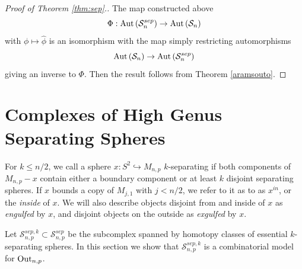 
\begin{proof}[Proof of Theorem \ref{thm:sep}.]
The map constructed above
$$\Phi: \operatorname{Aut} \left ( \mathcal S^{sep}_n \right) \to \operatorname{Aut} \left ( \mathcal S_n \right)$$
with $\phi \mapsto \hat \phi$
is an isomorphism with the  map simply restricting automorphisms
$$\operatorname{Aut} \left ( \mathcal S_n \right) \to   \operatorname{Aut} \left ( \mathcal S^{sep}_n \right)$$
giving an inverse to $\Phi$.
Then the result follows from
Theorem \ref{aramsouto}.
\end{proof}

\section{Complexes of High Genus Separating Spheres}
\label{section:highgenussep}

For $k\leq n/2$, we call a sphere $x: S^2 \hookrightarrow M_{n,p}$ $k$-separating
if both components of
$M_{n,p}-x$
contain either a boundary component
or at least $k$ disjoint separating spheres.
If $x$ bounds a copy of $M_{j,1}$ with $j<n/2$,
we refer to it as to as $x^{in}$, or the \emph{inside} of $x$.
We will also describe objects disjoint from and inside of $x$ as \emph{engulfed} by $x$,
and disjoint objects on the outside as \emph{exgulfed} by $x$.

Let $\mathcal S^{sep,k}_{n,p} \subset \mathcal S^{sep}_{n,p}$
be the subcomplex spanned by homotopy classes of essential $k$-separating
spheres.
In this section we show that $\mathcal S^{sep,k}_{n,p}$ is a combinatorial model for $\operatorname{Out}_{n,p}$.

\thmhighsep*

